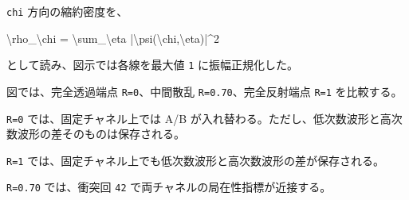 \documentclass[
  xelatex,
  ja=standard]{bxjsarticle}
\newenvironment{Shaded}{}{}
\newcommand{\NormalTok}[1]{#1}
\begin{document}
\texttt{chi} 方向の縮約密度を、

\begin{Shaded}
\begin{Highlighting}[]
\NormalTok{\textbackslash{}rho\_\textbackslash{}chi}
\NormalTok{=}
\NormalTok{\textbackslash{}sum\_\textbackslash{}eta |\textbackslash{}psi(\textbackslash{}chi,\textbackslash{}eta)|\^{}2}
\end{Highlighting}
\end{Shaded}

として読み、図示では各線を最大値 \texttt{1} に振幅正規化した。

図では、完全透過端点 \texttt{R=0}、中間散乱
\texttt{R=0.70}、完全反射端点 \texttt{R=1} を比較する。

\texttt{R=0} では、固定チャネル上では A/B
が入れ替わる。ただし、低次数波形と高次数波形の差そのものは保存される。

\texttt{R=1}
では、固定チャネル上でも低次数波形と高次数波形の差が保存される。

\texttt{R=0.70} では、衝突回 \texttt{42}
で両チャネルの局在性指標が近接する。
\end{document}
